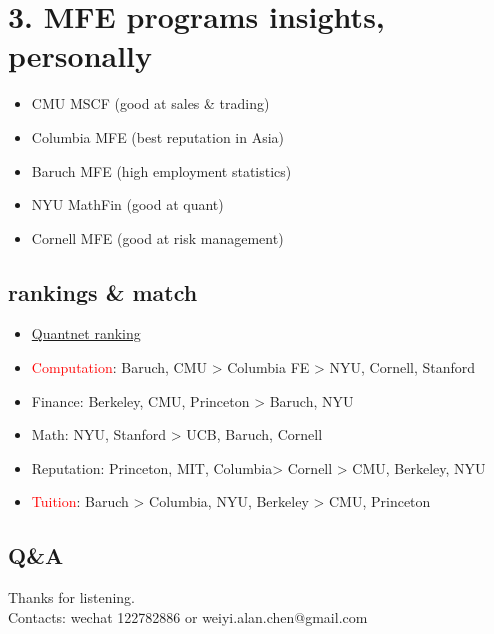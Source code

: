 \documentclass[
paper=128mm:96mm, %
fontsize=11pt, %
pagesize, %
parskip=half-, %
]{scrartcl} %
\theoremstyle{mythmstyle} %
\begin{document}

\section{3. MFE programs insights, personally}

\begin{itemize}
	\item CMU MSCF (good at sales \& trading)
	\item Columbia MFE (best reputation in Asia)
	\item Baruch MFE (high employment statistics)
	\item NYU MathFin (good at quant)
	\item Cornell MFE (good at risk management)
\end{itemize}

\clearpage


\subsection{rankings \& match}

\begin{itemize}
\item \href{https://www.quantnet.com/mfe-programs-rankings/}{Quantnet ranking}
\item \textcolor{red}{Computation}: Baruch, CMU > Columbia FE > NYU, Cornell, Stanford
\item Finance: Berkeley, CMU, Princeton > Baruch, NYU
\item Math: NYU, Stanford > UCB, Baruch, Cornell
\item Reputation: Princeton, MIT, Columbia> Cornell > CMU, Berkeley, NYU
\item \textcolor{red}{Tuition}: Baruch > Columbia, NYU, Berkeley > CMU, Princeton
\end{itemize}

\clearpage


\subsection{Q\&A}
Thanks for listening. \\
Contacts: wechat 122782886 or weiyi.alan.chen@gmail.com
\clearpage
\end{document}
